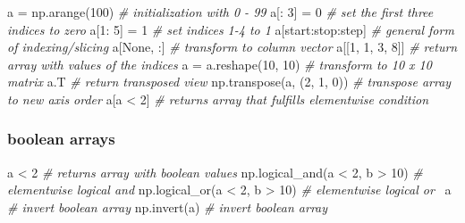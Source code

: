 \documentclass[10pt,a4paperpaper,twocolumn]{article}
\newenvironment{Shaded}{}{}
\newcommand{\DecValTok}[1]{\textcolor[rgb]{0.25,0.63,0.44}{{#1}}}
\newcommand{\CommentTok}[1]{\textcolor[rgb]{0.38,0.63,0.69}{\textit{{#1}}}}
\newcommand{\VariableTok}[1]{\textcolor[rgb]{0.10,0.09,0.49}{{#1}}}
\newcommand{\OperatorTok}[1]{\textcolor[rgb]{0.40,0.40,0.40}{{#1}}}
\newcommand{\NormalTok}[1]{{#1}}
\begin{document}
\begin{Shaded}
\begin{Highlighting}[]
\NormalTok{a }\OperatorTok{=} \NormalTok{np.arange(}\DecValTok{100}\NormalTok{)          }\CommentTok{# initialization with 0 - 99}
\NormalTok{a[: }\DecValTok{3}\NormalTok{] }\OperatorTok{=} \DecValTok{0}                  \CommentTok{# set the first three indices to zero}
\NormalTok{a[}\DecValTok{1}\NormalTok{: }\DecValTok{5}\NormalTok{] }\OperatorTok{=} \DecValTok{1}                 \CommentTok{# set indices 1-4 to 1}
\NormalTok{a[start:stop:step]          }\CommentTok{# general form of indexing/slicing}
\NormalTok{a[}\VariableTok{None}\NormalTok{, :]                  }\CommentTok{# transform to column vector}
\NormalTok{a[[}\DecValTok{1}\NormalTok{, }\DecValTok{1}\NormalTok{, }\DecValTok{3}\NormalTok{, }\DecValTok{8}\NormalTok{]]             }\CommentTok{# return array with values of the indices}
\NormalTok{a }\OperatorTok{=} \NormalTok{a.reshape(}\DecValTok{10}\NormalTok{, }\DecValTok{10}\NormalTok{)       }\CommentTok{# transform to 10 x 10 matrix}
\NormalTok{a.T                         }\CommentTok{# return transposed view}
\NormalTok{np.transpose(a, (}\DecValTok{2}\NormalTok{, }\DecValTok{1}\NormalTok{, }\DecValTok{0}\NormalTok{))  }\CommentTok{# transpose array to new axis order}
\NormalTok{a[a }\OperatorTok{<} \DecValTok{2}\NormalTok{]                    }\CommentTok{# returns array that fulfills elementwise condition}
\end{Highlighting}
\end{Shaded}

\hypertarget{boolean-arrays}{\subsubsection{boolean
arrays}\label{boolean-arrays}}

\begin{Shaded}
\begin{Highlighting}[]
\NormalTok{a }\OperatorTok{<} \DecValTok{2}                          \CommentTok{# returns array with boolean values}
\NormalTok{np.logical_and(a }\OperatorTok{<} \DecValTok{2}\NormalTok{, b }\OperatorTok{>} \DecValTok{10}\NormalTok{)  }\CommentTok{# elementwise logical and}
\NormalTok{np.logical_or(a }\OperatorTok{<} \DecValTok{2}\NormalTok{, b }\OperatorTok{>} \DecValTok{10}\NormalTok{)   }\CommentTok{# elementwise logical or}
\OperatorTok{~}\NormalTok{a                             }\CommentTok{# invert boolean array}
\NormalTok{np.invert(a)                   }\CommentTok{# invert boolean array}
\end{Highlighting}
\end{Shaded}
\end{document}
